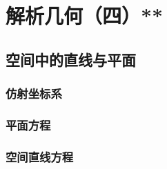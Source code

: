 
\chapter{解析几何（四）**}
\section{空间中的直线与平面}
\subsection{仿射坐标系}
\clearpage
\subsection{平面方程}
\clearpage
\subsection{空间直线方程}
\clearpage


